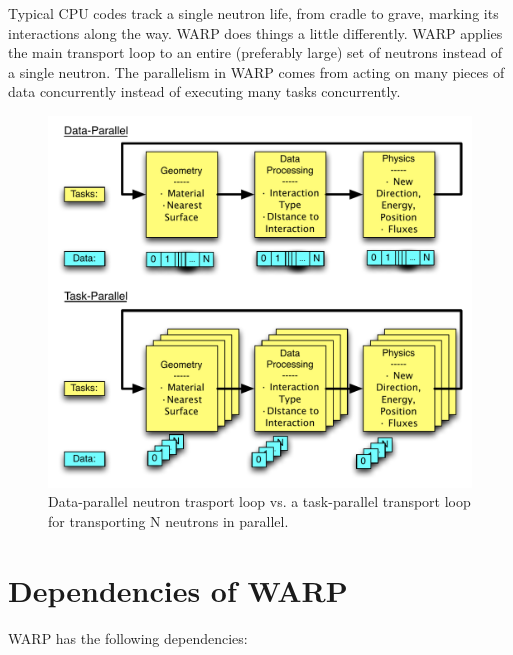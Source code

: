 \documentclass[twoside,a4paper]{refart}
\begin{document}
Typical CPU codes track a single neutron life, from cradle to grave, marking its interactions along the 
way. WARP does things a little differently.  WARP applies the main transport loop to an entire (preferably
large) set of neutrons instead of a single neutron.  The parallelism in WARP comes from acting on many 
pieces of data concurrently instead of executing many tasks concurrently.


\begin{figure}[h!] 
  \centering
    \includegraphics[width=\textwidth]{graphics/datavtask.pdf}
     \caption{Data-parallel neutron trasport loop vs. a task-parallel transport loop for transporting N neutrons in parallel.  \label{datavtask} }
\end{figure}

\section{Dependencies of WARP}

WARP has the following dependencies:
\end{document}
